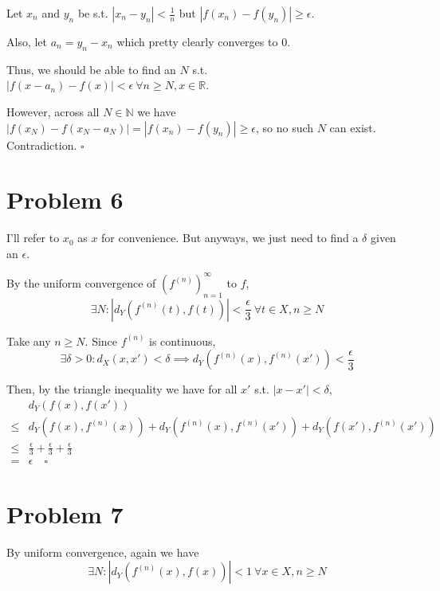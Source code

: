 \documentclass[12pt]{article}
\newcommand{\N}{\mathbb{N}}
\newcommand{\R}{\mathbb{R}}
\begin{document}
Let $x_n$ and $y_n$ be s.t. $|x_n-y_n| < \frac{1}{n}$ but $|f(x_n)-f(y_n)| \ge \epsilon$.

Also, let $a_n=y_n-x_n$ which pretty clearly converges to $0$.

Thus, we should be able to find an $N$ s.t. $|f(x-a_n)-f(x)| < \epsilon\ \forall n \ge N, x \in \R$.

However, across all $N \in \N$ we have $|f(x_N)-f(x_N-a_N)|=|f(x_n)-f(y_n)| \ge \epsilon$,
so no such $N$ can exist. Contradiction. $\square$

\pagebreak

\section{Problem 6}

I'll refer to $x_0$ as $x$ for convenience.
But anyways, we just need to find a $\delta$ given an $\epsilon$.

By the uniform convergence of $\left(f^{(n)}\right)_{n=1}^\infty$ to $f$,
\[\exists N: \left|d_Y\left(f^{(n)}(t), f(t)\right)\right| < \frac{\epsilon}{3}\ \forall t \in X, n \ge N\]

Take any $n \ge N$.
Since $f^{(n)}$ is continuous,
\[\exists \delta > 0: d_X(x, x') < \delta \implies d_Y\left(f^{(n)}(x), f^{(n)}(x')\right) < \frac{\epsilon}{3}\]

Then, by the triangle inequality we have for all $x'$ s.t. $|x-x'| < \delta$,
\begin{align*}
        & d_Y(f(x), f(x'))                                                                                                \\
  \le{} & d_Y\left(f(x), f^{(n)}(x)\right) + d_Y\left(f^{(n)}(x), f^{(n)}(x')\right) + d_Y\left(f(x'), f^{(n)}(x')\right) \\
  \le{} & \frac{\epsilon}{3} + \frac{\epsilon}{3} + \frac{\epsilon}{3}                                                    \\
  ={}   & \epsilon\quad\square
\end{align*}

\pagebreak

\section{Problem 7}

By uniform convergence, again we have
\[\exists N: \left|d_Y\left(f^{(n)}(x), f(x)\right)\right| < 1\ \forall x \in X, n \ge N\]
\end{document}
